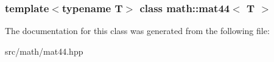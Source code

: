 \subsubsection*{template$<$typename T$>$ class math::mat44$<$ T $>$}



The documentation for this class was generated from the following file:\begin{DoxyCompactItemize}
\item 
src/math/mat44.hpp\end{DoxyCompactItemize}
